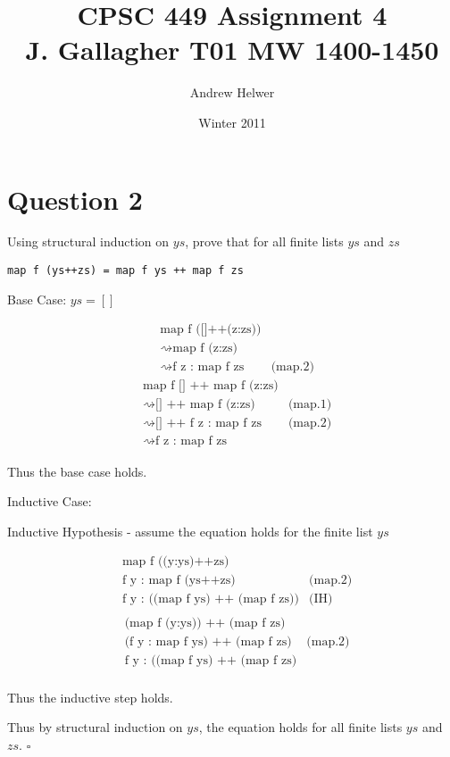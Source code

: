 \documentclass{article}
\begin{document}
\title{CPSC 449 Assignment 4 \\ J. Gallagher T01 MW 1400-1450}
\author{Andrew Helwer}
\date{Winter 2011}
\maketitle

\lstset{language=Haskell, frame=single}

\section{Question 2}

Using structural induction on $ys$, prove that for all finite lists $ys$ and $zs$
\begin{lstlisting}
map f (ys++zs) = map f ys ++ map f zs
\end{lstlisting}

Base Case: $ys = []$

\begin{align*}
& \text{map f ([]++(z:zs))} \\
& \rightsquigarrow \text{map f (z:zs)} \\
& \rightsquigarrow \text{f z : map f zs}	&\text{(map.2)} 
\end{align*}
\begin{align*}
& \text{map f [] ++ map f (z:zs)} \\
& \rightsquigarrow \text{[] ++ map f (z:zs)}	&\text{(map.1)} \\
& \rightsquigarrow \text{[] ++ f z : map f zs}	&\text{(map.2)} \\
& \rightsquigarrow \text{f z : map f zs}
\end{align*}

Thus the base case holds.

Inductive Case:

Inductive Hypothesis - assume the equation holds for the finite list $ys$ 

\begin{align*}
& \text{map f ((y:ys)++zs)} \\
& \text{f y : map f (ys++zs)}			&\text{(map.2)} \\
& \text{f y : ((map f ys) ++ (map f zs))}	&\text{(IH)} \\
\end{align*}
\begin{align*}
& \text{(map f (y:ys)) ++ (map f zs)} \\
& \text{(f y : map f ys) ++ (map f zs)} 	&\text{(map.2)} \\
& \text{f y : ((map f ys) ++ (map f zs)} \\
\end{align*}

Thus the inductive step holds.

Thus by structural induction on $ys$, the equation holds for all finite lists $ys$ and $zs$. $\square$
\end{document}
